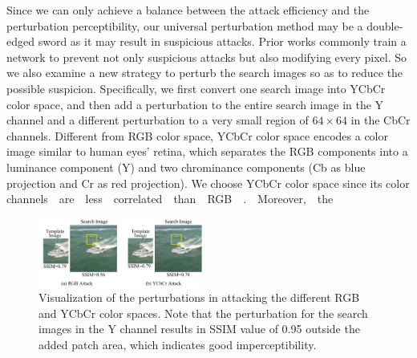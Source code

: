 \documentclass[journal]{IEEEtran}
\renewcommand{\uline}{}
\begin{document}
Since we can only achieve a balance between the attack efficiency and the perturbation perceptibility, our universal perturbation method may be a double-edged sword as it may result in suspicious attacks. Prior works commonly train a network to prevent not only suspicious attacks but also modifying every pixel. So we also examine a new strategy to perturb the search \uline{images} so as to reduce the possible suspicion. Specifically, we first convert \uline{one} search image into YCbCr color space, and then add a perturbation to the entire search image in the Y channel and a different perturbation to a very small region of $64\times64$ in the CbCr \uline{channels}. Different from RGB color space, YCbCr color space encodes a color image similar to human eyes’ retina, which separates the RGB components into a luminance component (Y) and two chrominance components (Cb as blue projection and Cr as red projection). We choose YCbCr color space since its color
channels~~are~~less~~correlated~~than~~RGB~~\cite{8630918}.~~Moreover,~~the
\begin{figure}[t]
  \centering
  \includegraphics[width=0.48\textwidth]{images_imperceptible/1.pdf}
  \caption{Visualization of the perturbations in attacking the different RGB and YCbCr color spaces. Note that the perturbation \uline{for} the search \uline{images} in the Y channel results in SSIM value of 0.95 outside the added patch area, which \uline{indicates good} imperceptibility.}
  \label{fig:YCbCr}
\end{figure}
\end{document}
